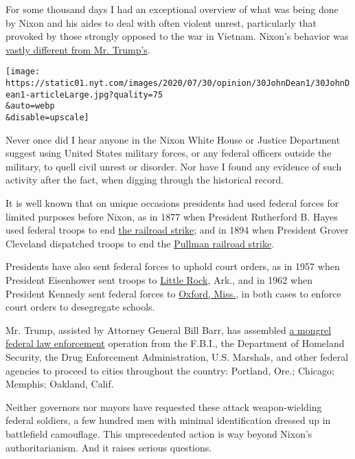For some thousand days I had an exceptional overview of what was being
done by Nixon and his aides to deal with often violent unrest,
particularly that provoked by those strongly opposed to the war in
Vietnam. Nixon's behavior was
\href{https://www.nytimes.com/2020/06/04/opinion/trump-nixon.html}{vastly
different from Mr. Trump's}.

\texttt{[image: https://static01.nyt.com/images/2020/07/30/opinion/30JohnDean1/30JohnDean1-articleLarge.jpg?quality=75\\\&auto=webp\\\&disable=upscale]}

Never once did I hear anyone in the Nixon White House or Justice
Department suggest using United States military forces, or any federal
officers outside the military, to quell civil unrest or disorder. Nor
have I found any evidence of such activity after the fact, when digging
through the historical record.

It is well known that on unique occasions presidents had used federal
forces for limited purposes before Nixon, as in 1877 when President
Rutherford B. Hayes used federal troops to end
\href{http://ohiohistorycentral.org/w/Great_Railroad_Strike_of_1877}{the
railroad strike}; and in 1894 when President Grover Cleveland dispatched
troops to end the
\href{http://www.encyclopedia.chicagohistory.org/pages/1029.html}{Pullman
railroad strike}.

Presidents have also sent federal forces to uphold court orders, as in
1957 when President Eisenhower sent troops to
\href{http://crdl.usg.edu/export/html/dde/ddetimeline/crdl_dde_ddetimeline_130.html}{Little
Rock}, Ark., and in 1962 when President Kennedy sent federal forces to
\href{http://crdl.usg.edu/events/ole_miss_integration/?Welcome}{Oxford,
Miss.}, in both cases to enforce court orders to desegregate schools.

Mr. Trump, assisted by Attorney General Bill Barr, has assembled
\href{https://www.nytimes.com/2020/07/20/us/politics/trump-chicago-portland-federal-agents.html}{a
mongrel federal law enforcement} operation from the F.B.I., the
Department of Homeland Security, the Drug Enforcement Administration,
U.S. Marshals, and other federal agencies to proceed to cities
throughout the country: Portland, Ore.; Chicago; Memphis; Oakland,
Calif.

Neither governors nor mayors have requested these attack weapon-wielding
federal soldiers, a few hundred men with minimal identification dressed
up in battlefield camouflage. This unprecedented action is way beyond
Nixon's authoritarianism. And it raises serious questions.

